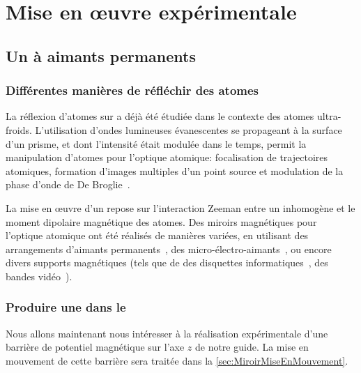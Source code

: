 \section{Mise en \oe uvre expérimentale}\label{sec:MiroirMiseEnOeuvre}


\subsection{Un \mima à aimants permanents}

\subsubsection{Différentes manières de réfléchir des atomes}
La réflexion d'atomes sur \mimo a déjà été étudiée dans le contexte des atomes ultra-froids. L'utilisation d'ondes lumineuses évanescentes se propageant à la surface d'un prisme, et dont l'intensité était modulée dans le temps, permit la manipulation d'atomes pour l'optique atomique: focalisation de trajectoires atomiques, formation d'images multiples d'un point source et modulation de la phase d'onde de De Broglie~\cite{SSD95,ASD96}.

La mise en \oe uvre d'un \mima repose sur l'interaction Zeeman entre un \chm inhomogène et le moment dipolaire magnétique des atomes. 
Des miroirs magnétiques pour l'optique atomique ont été réalisés de manières variées, en utilisant des arrangements d'aimants permanents~\cite{SMR96}, des micro-électro-aimants~\cite{JDT98, DZL99}, ou encore divers supports magnétiques (tels que de des disquettes informatiques~\cite{HBR97}, des bandes vidéo~\cite{RHH00}).  

\casse

\subsubsection{Produire une \bapot dans le \gm}

Nous allons maintenant nous intéresser à la réalisation expérimentale d'une barrière de potentiel magnétique sur l'axe $z$ de notre guide. La mise en mouvement de cette barrière sera traitée dans la \autoref{sec:MiroirMiseEnMouvement}.

